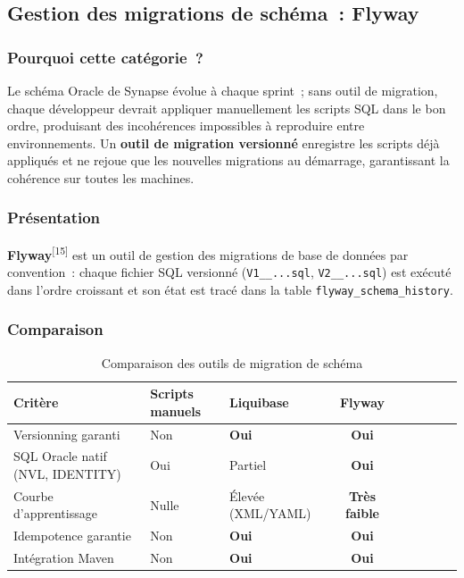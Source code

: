 \subsection{Gestion des migrations de schéma~: Flyway}

\subsubsection*{Pourquoi cette catégorie~?}

Le schéma Oracle de Synapse évolue à chaque sprint~; sans outil de migration, chaque développeur devrait appliquer manuellement les scripts SQL dans le bon ordre, produisant des incohérences impossibles à reproduire entre environnements. Un \textbf{outil de migration versionné} enregistre les scripts déjà appliqués et ne rejoue que les nouvelles migrations au démarrage, garantissant la cohérence sur toutes les machines.

\subsubsection*{Présentation}

\textbf{Flyway}\textsuperscript{[15]} est un outil de gestion des migrations de base de données par
convention~: chaque fichier SQL versionné (\texttt{V1\_\_...sql}, \texttt{V2\_\_...sql})
est exécuté dans l'ordre croissant et son état est tracé dans la table
\texttt{flyway\_schema\_history}.

\subsubsection*{Comparaison}

\begin{table}[H]
\centering
\caption{Comparaison des outils de migration de schéma}
\label{tab:cmp_flyway}
\begin{tabularx}{\textwidth}{VlVCVCVCV}
\hline
\textbf{Critère} & \textbf{Scripts manuels} & \textbf{Liquibase} & \textbf{Flyway} \\
\hline
Versionning garanti          & Non      & \textbf{Oui} & \textbf{Oui} \\
\hline
SQL Oracle natif (NVL, IDENTITY) & Oui  & Partiel      & \textbf{Oui} \\
\hline
Courbe d'apprentissage       & Nulle    & Élevée (XML/YAML) & \textbf{Très faible} \\
\hline
Idempotence garantie         & Non      & \textbf{Oui} & \textbf{Oui} \\
\hline
Intégration Maven            & Non      & \textbf{Oui} & \textbf{Oui} \\
\hline
\end{tabularx}
\end{table}

